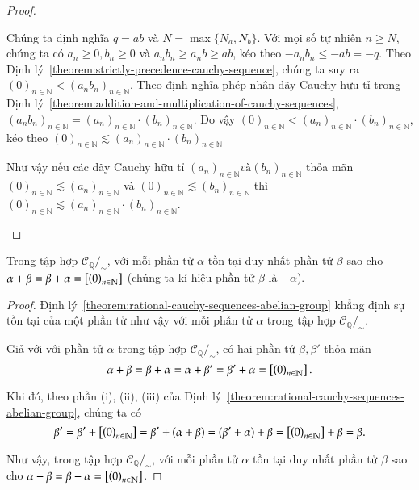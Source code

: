 \begin{proof}
\begin{enumerate}[label={(\roman*)}]
\begin{enumerate}[label={\textbf{Trường hợp \arabic*.}},itemindent=1cm]
                        Chúng ta định nghĩa $q = ab$ và $N = \max\{ N_{a}, N_{b} \}$. Với mọi số tự nhiên $n\geq N$, chúng ta có $a_{n}\geq 0, b_{n}\geq 0$ và $a_{n}b_{n}\geq a_{n}b \geq ab$, kéo theo $-a_{n}b_{n}\leq -ab = -q$. Theo Định lý~\ref{theorem:strictly-precedence-cauchy-sequence}, chúng ta suy ra ${(0)}_{n\in\mathbb{N}} < {(a_{n}b_{n})}_{n\in\mathbb{N}}$. Theo định nghĩa phép nhân dãy Cauchy hữu tỉ trong Định lý~\ref{theorem:addition-and-multiplication-of-cauchy-sequences}, ${(a_{n}b_{n})}_{n\in\mathbb{N}} = {(a_{n})}_{n\in\mathbb{N}}\cdot {(b_{n})}_{n\in\mathbb{N}}$. Do vậy ${(0)}_{n\in\mathbb{N}} < {(a_{n})}_{n\in\mathbb{N}}\cdot {(b_{n})}_{n\in\mathbb{N}}$, kéo theo ${(0)}_{n\in\mathbb{N}} \lesssim {(a_{n})}_{n\in\mathbb{N}}\cdot {(b_{n})}_{n\in\mathbb{N}}$
              \end{enumerate}

              Như vậy nếu các dãy Cauchy hữu tỉ ${(a_{n})}_{n\in\mathbb{N}} và {(b_{n})}_{n\in\mathbb{N}}$ thỏa mãn ${(0)}_{n\in\mathbb{N}}\lesssim {(a_{n})}_{n\in\mathbb{N}}$ và ${(0)}_{n\in\mathbb{N}}\lesssim {(b_{n})}_{n\in\mathbb{N}}$ thì ${(0)}_{n\in\mathbb{N}}\lesssim {(a_{n})}_{n\in\mathbb{N}}\cdot {(b_{n})}_{n\in\mathbb{N}}$.
    \end{enumerate}
\end{proof}

\begin{proposition}\label{proposition:uniqueness-of-additive-inverse-cauchy-sequence}
    Trong tập hợp $\mathscr{C}_{\mathbb{Q}}/_{\sim}$, với mỗi phần tử $\alpha$ tồn tại duy nhất phần tử $\beta$ sao cho $\alpha + \beta = \beta + \alpha = \left[{\left({0}\right)}_{{n}\in\mathbb{N}}\right]$ (chúng ta kí hiệu phần tử $\beta$ là $-\alpha$).
\end{proposition}

\begin{proof}
    Định lý~\ref{theorem:rational-cauchy-sequences-abelian-group} khẳng định sự tồn tại của một phần tử như vậy với mỗi phần tử $\alpha$ trong tập hợp $\mathscr{C}_{\mathbb{Q}}/_{\sim}$.

    Giả với với phần tử $\alpha$ trong tập hợp $\mathscr{C}_{\mathbb{Q}}/_{\sim}$, có hai phần tử $\beta, \beta'$ thỏa mãn
    \[
        \alpha + \beta = \beta + \alpha = \alpha + \beta' = \beta' + \alpha = \left[{\left({0}\right)}_{{n}\in\mathbb{N}}\right].
    \]

    Khi đó, theo phần (i), (ii), (iii) của Định lý~\ref{theorem:rational-cauchy-sequences-abelian-group}, chúng ta có
    \[
        \beta' = \beta' + \left[{\left({0}\right)}_{{n}\in\mathbb{N}}\right] = \beta' + (\alpha + \beta) = (\beta' + \alpha) + \beta = \left[{\left({0}\right)}_{{n}\in\mathbb{N}}\right] + \beta = \beta.
    \]

    Như vậy, trong tập hợp $\mathscr{C}_{\mathbb{Q}}/_{\sim}$, với mỗi phần tử $\alpha$ tồn tại duy nhất phần tử $\beta$ sao cho $\alpha + \beta = \beta + \alpha = \left[{\left({0}\right)}_{{n}\in\mathbb{N}}\right]$.
\end{proof}

